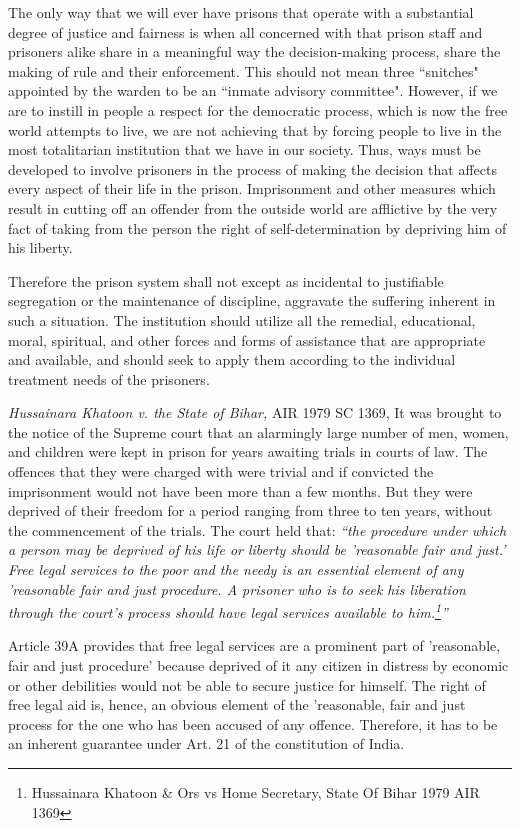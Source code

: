 \begin{multicols}{2}
\noi
The only way that we will ever have prisons that operate with a substantial degree of justice and fairness is when all concerned with that prison staff and prisoners alike share in a meaningful way the decision-making process, share the making of rule and their enforcement. This should not mean three “snitches" appointed by the warden to be an “inmate advisory committee". However, if we are to instill in people a respect for the democratic process, which is now the free world attempts to live, we are not achieving that by forcing people to live in the most totalitarian institution that we have in our society. Thus, ways must be developed to involve prisoners in the process of making the decision that affects every aspect of their life in the prison. Imprisonment and other measures which result in cutting off an offender from the outside world are afflictive by the very fact of taking from the person the right of self-determination by depriving him of his liberty.

\noi
Therefore the prison system shall not except as incidental to justifiable segregation or the maintenance of discipline, aggravate the suffering inherent in such a situation. The institution should utilize all the remedial, educational, moral, spiritual, and other forces and forms of assistance that are appropriate and available, and should seek to apply them according to the individual treatment needs of the prisoners.

\noi
\textit{Hussainara Khatoon v. the State of Bihar,} AIR 1979 SC 1369, It was brought to the notice of the Supreme court that an alarmingly large number of men, women, and children were kept in prison for years awaiting trials in courts of law. The offences that they were charged with were trivial and if convicted the imprisonment would not have been more than a few months. But they were deprived of their freedom for a period ranging from three to ten years, without the commencement of the trials. The court held that: \textit{“the procedure under which a person may be deprived of his life or liberty should be 'reasonable fair and just.' Free legal services to the poor and the needy is an essential element of any 'reasonable fair and just procedure. A prisoner who is to seek his liberation through the court's process should have legal services available to him.\footnote{Hussainara Khatoon \& Ors vs Home Secretary, State Of Bihar 1979 AIR 1369}”}

\noi
Article 39A provides that free legal services are a prominent part of 'reasonable, fair and just procedure’ because deprived of it any citizen in distress by economic or other debilities would not be able to secure justice for himself. The right of free legal aid is, hence, an obvious element of the 'reasonable, fair and just process for the one who has been accused of any offence. Therefore, it has to be an inherent guarantee under Art. 21 of the constitution of India.


\end{multicols}
